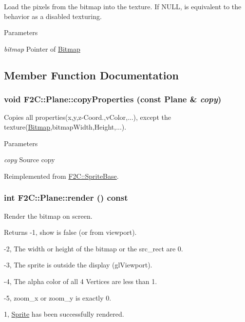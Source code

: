 Load the pixels from the bitmap into the texture. If NULL, is equivalent to the behavior as a disabled texturing. 
\begin{DoxyParams}{Parameters}
\item[{\em bitmap}]Pointer of \hyperlink{class_f2_c_1_1_bitmap}{Bitmap} \end{DoxyParams}


\subsection{Member Function Documentation}
\hypertarget{class_f2_c_1_1_plane_ac3ee4529b515cc641b6e9b27d76fc2ef}{
\subsubsection[{copyProperties}]{\setlength{\rightskip}{0pt plus 5cm}void F2C::Plane::copyProperties (const {\bf Plane} \& {\em copy})}}
\label{class_f2_c_1_1_plane_ac3ee4529b515cc641b6e9b27d76fc2ef}


Copies all properties(x,y,z-\/Coord.,vColor,...), except the texture(\hyperlink{class_f2_c_1_1_bitmap}{Bitmap},bitmapWidth,Height,...). 
\begin{DoxyParams}{Parameters}
\item[{\em copy}]Source copy \end{DoxyParams}


Reimplemented from \hyperlink{class_f2_c_1_1_sprite_base_a8f7ea8a95a07688bfb2e6268a52b9215}{F2C::SpriteBase}.\hypertarget{class_f2_c_1_1_plane_ace8103ddb3071c72aa40fff492c23135}{
\subsubsection[{render}]{\setlength{\rightskip}{0pt plus 5cm}int F2C::Plane::render () const}}
\label{class_f2_c_1_1_plane_ace8103ddb3071c72aa40fff492c23135}


Render the bitmap on screen. \begin{DoxyReturn}{Returns}
-\/1, show is false (or from viewport). 

-\/2, The width or height of the bitmap or the src\_\-rect are 0. 

-\/3, The sprite is outside the display (glViewport). 

-\/4, The alpha color of all 4 Vertices are less than 1. 

-\/5, zoom\_\-x or zoom\_\-y is exactly 0. 

1, \hyperlink{class_f2_c_1_1_sprite}{Sprite} has been successfully rendered. 
\end{DoxyReturn}


